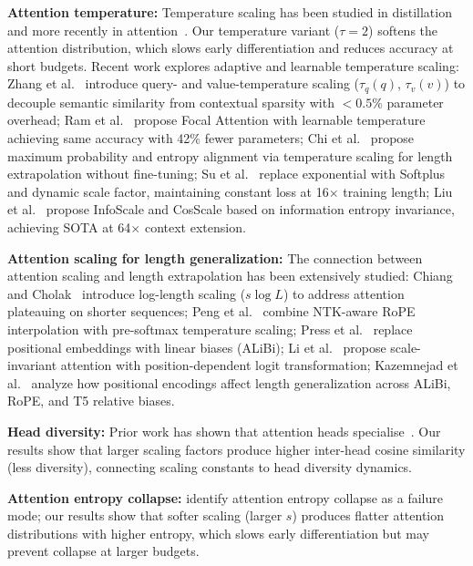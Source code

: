 \documentclass[10pt,a4paper]{article}
\begin{document}
\textbf{Attention temperature:} Temperature scaling has been studied in distillation~\cite{hinton2015} and more recently in attention~\cite{hinton2015,zhai2023,dong2021}. Our temperature variant ($\tau = 2$) softens the attention distribution, which slows early differentiation and reduces accuracy at short budgets. Recent work explores adaptive and learnable temperature scaling: Zhang et al.~\cite{zhang2024selective} introduce query- and value-temperature scaling ($\tau_q(q)$, $\tau_v(v)$) to decouple semantic similarity from contextual sparsity with $<0.5\%$ parameter overhead; Ram et al.~\cite{ram2025focal} propose Focal Attention with learnable temperature achieving same accuracy with 42\% fewer parameters; Chi et al.~\cite{chi2024attention} propose maximum probability and entropy alignment via temperature scaling for length extrapolation without fine-tuning; Su et al.~\cite{su2025softplus} replace exponential with Softplus and dynamic scale factor, maintaining constant loss at 16$\times$ training length; Liu et al.~\cite{liu2025information} propose InfoScale and CosScale based on information entropy invariance, achieving SOTA at 64$\times$ context extension.

\textbf{Attention scaling for length generalization:} The connection between attention scaling and length extrapolation has been extensively studied: Chiang and Cholak~\cite{chiang2022overcoming} introduce log-length scaling ($s \log L$) to address attention plateauing on shorter sequences; Peng et al.~\cite{peng2023yarn} combine NTK-aware RoPE interpolation with pre-softmax temperature scaling; Press et al.~\cite{press2021alibi} replace positional embeddings with linear biases (ALiBi); Li et al.~\cite{li2025scale} propose scale-invariant attention with position-dependent logit transformation; Kazemnejad et al.~\cite{kazemnejad2023impact} analyze how positional encodings affect length generalization across ALiBi, RoPE, and T5 relative biases.

\textbf{Head diversity:} Prior work has shown that attention heads specialise~\cite{vaswani2017,voita2019analyzing}. Our results show that larger scaling factors produce higher inter-head cosine similarity (less diversity), connecting scaling constants to head diversity dynamics.

\textbf{Attention entropy collapse:} \cite{zhai2023} identify attention entropy collapse as a failure mode; our results show that softer scaling (larger $s$) produces flatter attention distributions with higher entropy, which slows early differentiation but may prevent collapse at larger budgets.
\end{document}
